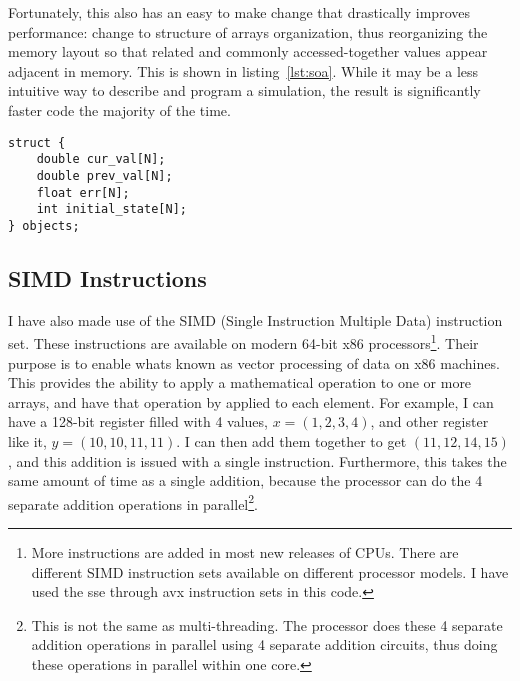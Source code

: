 Fortunately, this also has an easy to make change that drastically improves performance: change to structure of
arrays organization, thus reorganizing the memory layout so that related and commonly accessed-together values
appear adjacent in memory\cite{intel-opt}. This is shown in listing~\ref{lst:soa}. While it may be a less intuitive way to describe
and program a simulation, the result is significantly faster code the majority of the time.

\begin{minipage}{\linewidth}
\begin{lstlisting}[frame=single,label=lst:soa,caption={Structure of arrays organization.}]
struct {
	double cur_val[N];
	double prev_val[N];
	float err[N];
	int initial_state[N];
} objects;
\end{lstlisting}
\end{minipage}
















\subsection{SIMD Instructions}
I have also made use of the SIMD (Single Instruction Multiple Data) instruction set. These instructions are available
on modern 64-bit x86 processors\cite{intel-3a}\footnote{More instructions are added in most new releases of CPUs. There are different
SIMD instruction sets available on different processor models. I have used the sse through avx instruction sets in this
code.}. Their purpose is to enable whats known as vector processing of data on x86 machines. This provides the ability
to apply a mathematical operation to one or more arrays, and have that operation by applied to each element. For example,
I can have a 128-bit register filled with 4 values, $x=(1,2,3,4)$, and other register like it, $y=(10, 10, 11, 11)$. I can
then add them together to get $(11, 12, 14, 15)$, and this addition is issued with a single instruction. Furthermore, this
takes the same amount of time as a single addition, because the processor can do the 4 separate addition operations in
parallel\footnote{This is not the same as multi-threading. The processor does these 4 separate addition operations in parallel
using 4 separate addition circuits, thus doing these operations in parallel within one core.}.

